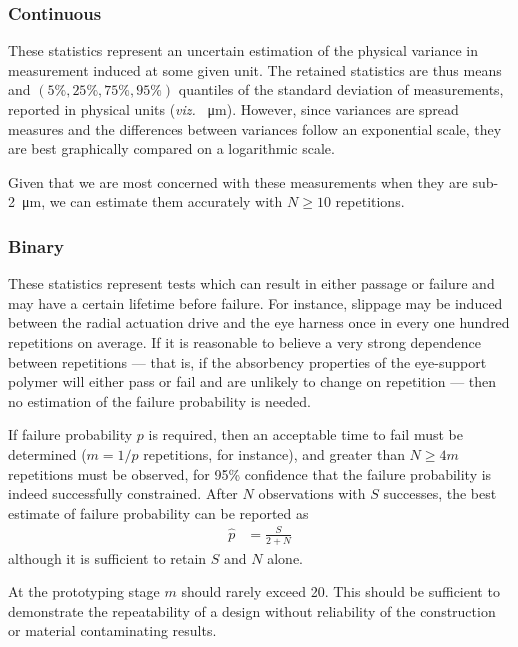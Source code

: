 \documentclass{article}
\begin{document}
\subsubsection{Continuous}
\label{sec:continuous}

These statistics represent an uncertain estimation of the physical variance in measurement induced at some given unit. The retained statistics are thus means and $(5\%, 25\%, 75\%, 95\%)$ quantiles of the standard deviation of measurements, reported in physical units (\textit{viz.} \SI{}{\micro m}). However, since variances are spread measures and the differences between variances follow an exponential scale, they are best graphically compared on a logarithmic scale.

Given that we are most concerned with these measurements when they are sub-\SI{2}{\micro m}, we can estimate them accurately with $N \ge 10$ repetitions.

\subsubsection{Binary}
\label{sec:binary}

These statistics represent tests which can result in either passage or failure and may have a certain lifetime before failure. For instance, slippage may be induced between the radial actuation drive and the eye harness once in every one hundred repetitions on average. If it is reasonable to believe a very strong dependence between repetitions --- that is, if the absorbency properties of the eye-support polymer will either pass or fail and are unlikely to change on repetition --- then no estimation of the failure probability is needed.

If failure probability $p$ is required, then an acceptable time to fail must be determined ($m = 1/p$ repetitions, for instance), and greater than $N \ge 4m$ repetitions must be observed, for 95\% confidence that the failure probability is indeed successfully constrained. After $N$ observations with $S$ successes, the best estimate of failure probability can be reported as
\begin{align}
  \hat{p} &= \frac{S}{2 + N}
\end{align}
although it is sufficient to retain $S$ and $N$ alone.

At the prototyping stage $m$ should rarely exceed 20. This should be sufficient to demonstrate the repeatability of a design without reliability of the construction or material contaminating results.
\end{document}
